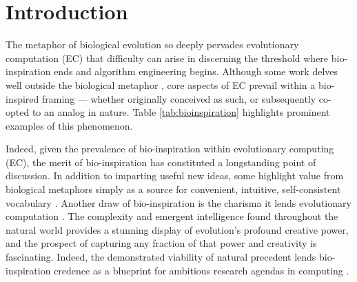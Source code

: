 %

\section{Introduction} \label{sec:introduction}

The metaphor of biological evolution so deeply pervades evolutionary computation (EC) that difficulty can arise in discerning the threshold where bio-inspiration ends and algorithm engineering begins.
Although some work delves well outside the biological metaphor \citep{hansen2001completely,munteanu1999improving,miller2015cartesian}, core aspects of EC prevail within a bio-inspired framing --- whether originally conceived as such, or subsequently co-opted to an analog in nature.
Table \ref{tab:bioinspiration} highlights prominent examples of this phenomenon.



Indeed, given the prevalence of bio-inspiration within evolutionary computing (EC), the merit of bio-inspiration has constituted a longstanding point of discussion.
In addition to imparting useful new ideas, some highlight value from biological metaphors simply as a source for convenient, intuitive, self-consistent vocabulary \citep{sorensen2015metaheuristics,banzhaf2006artificial}.
Another draw of bio-inspiration is the charisma it lends evolutionary computation \citep{lehman2020surprising}.
The complexity and emergent intelligence found throughout the natural world provides a stunning display of evolution’s profound creative power, and the prospect of capturing any fraction of that power and creativity is fascinating.
Indeed, the demonstrated viability of natural precedent lends bio-inspiration credence as a blueprint for ambitious research agendas in computing \citep{miikkulainen2021biological,banzhaf2006from}.

